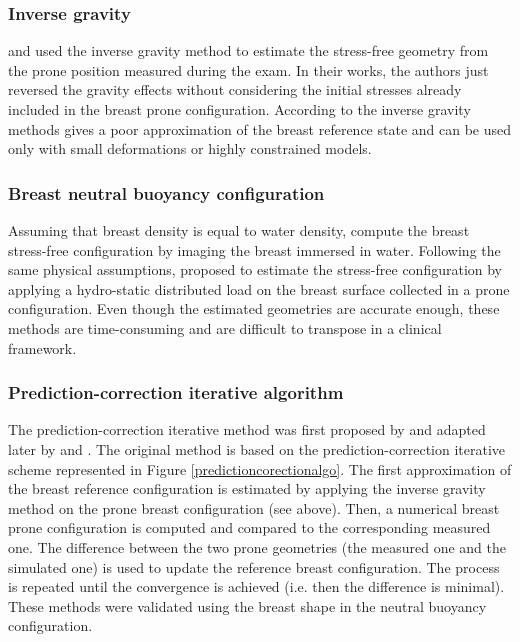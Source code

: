   \subsubsection*{Inverse gravity}\label{subsubsection:inversegravity}
 \cite{palomar_finite_2008} and \cite{ sturgeon_finite_element_2016} used the inverse gravity method to estimate the stress-free geometry from the prone position measured during the exam. In their works, the authors just reversed the gravity effects without considering the initial stresses already included in the breast prone configuration. According to \cite{eiben_breast_2014} the inverse gravity methods gives a poor approximation of the breast reference state and can be used only with small deformations or highly constrained models.  

 \subsubsection*{Breast neutral buoyancy configuration}
 Assuming that breast density is equal to water density, \cite{rajagopal_creating_2008} compute the breast stress-free configuration by imaging the breast immersed in water. Following the same physical assumptions, \cite{kuhlmann_mechanical_2013} proposed to estimate the stress-free configuration by applying a hydro-static distributed load on the breast surface collected in a prone configuration. Even though the estimated geometries are accurate enough, these methods are time-consuming and are difficult to transpose in a clinical framework. 

 \subsubsection*{Prediction-correction iterative algorithm}
 The prediction-correction iterative method was first proposed by \cite{govindjee_computational_1998} and adapted later by \cite{carter_biomechanical_2009} and \cite{eiben_breast_2014}. The original method is based on the prediction-correction iterative scheme represented in Figure \ref{predictioncorectionalgo}. The first approximation of the breast reference configuration is estimated by applying the inverse gravity method on the prone breast configuration (see above).  Then, a numerical breast prone configuration is computed and compared to the corresponding measured one. The difference between the two prone geometries (the measured one and the simulated one) is used to update the reference breast configuration. The process is repeated until the convergence is achieved (i.e. then the difference is minimal). These methods were validated using the breast shape in the neutral buoyancy configuration.

